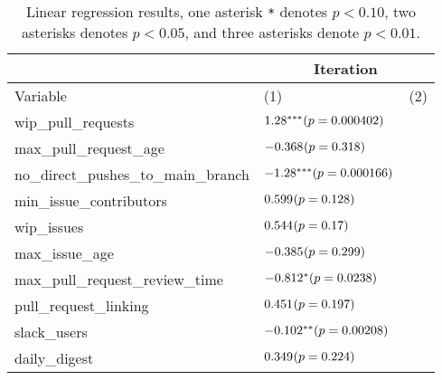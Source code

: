 \renewcommand{\arraystretch}{1.5}
\begin{table}[h]
\begin{center}
\begin{tabular}{|p{6cm}|p{4cm}|p{1cm}| } 
\cline{2-3}
\multicolumn{1}{c|}{} & \multicolumn{2}{c|}{Iteration} \\ %
\hline

Variable & (1) & (2) \\ [0.5ex]
\hline\hline

wip\_pull\_requests & $1.28^{***} \newline (p=0.000402)$ \\
max\_pull\_request\_age & $-0.368^{} \newline (p=0.318)$ \\
no\_direct\_pushes\_to\_main\_branch & $-1.28^{***} \newline (p=0.000166)$ \\
min\_issue\_contributors & $0.599^{} \newline (p=0.128)$ \\
wip\_issues & $0.544^{} \newline (p=0.17)$ \\
max\_issue\_age & $-0.385^{} \newline (p=0.299)$ \\
max\_pull\_request\_review\_time & $-0.812^{*} \newline (p=0.0238)$ \\
pull\_request\_linking & $0.451^{} \newline (p=0.197)$ \\
slack\_users & $-0.102^{**} \newline (p=0.00208)$ \\
daily\_digest & $0.349^{} \newline (p=0.224)$ \\

\hline
\end{tabular}
\caption{Linear regression results, one asterisk \texttt{*} denotes  $p < 0.10$, two asterisks denotes $p < 0.05$, and three asterisks denote $p < 0.01$.}
\label{tab:lmResults}
\end{center}
\end{table}